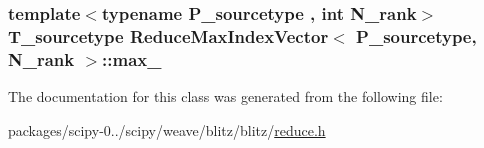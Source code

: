\subsubsection[{max\+\_\+}]{\setlength{\rightskip}{0pt plus 5cm}template$<$typename P\+\_\+sourcetype , int N\+\_\+rank$>$ {\bf T\+\_\+sourcetype} {\bf Reduce\+Max\+Index\+Vector}$<$ P\+\_\+sourcetype, N\+\_\+rank $>$\+::max\+\_\+\hspace{0.3cm}{\ttfamily [protected]}}\label{classReduceMaxIndexVector_a4bc06bbd26b382063eb6bee1fa4bea4d}


The documentation for this class was generated from the following file\+:\begin{DoxyCompactItemize}
\item 
packages/scipy-\/0../scipy/weave/blitz/blitz/\hyperlink{reduce_8h}{reduce.\+h}\end{DoxyCompactItemize}
